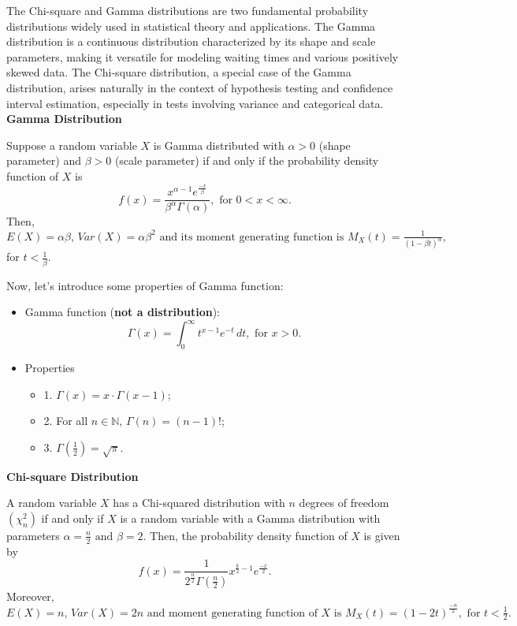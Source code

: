 The Chi-square and Gamma distributions are two fundamental probability distributions widely used in statistical theory and applications. The Gamma distribution is a continuous distribution characterized by its shape and scale parameters, making it versatile for modeling waiting times and various positively skewed data. The Chi-square distribution, a special case of the Gamma distribution, arises naturally in the context of hypothesis testing and confidence interval estimation, especially in tests involving variance and categorical data.\\

\textbf{Gamma Distribution}

\begin{definition}
Suppose a random variable $X$ is Gamma distributed with $\alpha > 0$ (shape parameter) and $\beta > 0$ (scale parameter) if and only if the probability density function of $X$ is \[ f(x) = \frac{x^{\alpha - 1} e^{\frac{-x}{\beta}}}{\beta^{\alpha} \Gamma(\alpha)}, \text{ for $0 < x < \infty.$}\]
Then, $E(X) = \alpha \beta \text{, } Var(X) = \alpha \beta^2 \text{ and its moment generating function is } M_{X}(t) = \frac{1}{(1 - \beta t)^{\alpha}},$ for $t < \frac{1}{\beta}.$
\end{definition}

Now, let's introduce some properties of Gamma function:

\begin{itemize}
	\item Gamma function (\textbf{not a distribution}): \[ \Gamma(x) = \int_{0}^{\infty}t^{x-1}e^{-t}\,dt, \text{ for $x > 0$.} \]
	\item Properties
		\begin{itemize}
			\item 1. $\Gamma(x) = x \cdot \Gamma(x-1)$;
			\item 2. For all $n \in \mathbb{N} \text{, } \Gamma(n) = (n - 1)!$; 
			\item 3. $\Gamma(\frac{1}{2}) = \sqrt{\pi}$.
		\end{itemize}
\end{itemize}

\textbf{Chi-square Distribution}

\begin{definition}
A random variable $X$ has a Chi-squared distribution with $n$ degrees of freedom $(\chi_{n}^{2})$ if and only if $X$ is a random variable with a Gamma distribution with parameters $\alpha = \frac{n}{2} \text{ and } \beta = 2.$ Then, the probability density function of $X$ is given by \[ f(x) = \frac{1}{2^{\frac{n}{2}} \Gamma(\frac{n}{2})} x^{\frac{k}{2} - 1} e^{\frac{-x}{2}}.\] Moreover, $E(X) = n \text{, } Var(X) = 2n \text{ and moment generating function of $X$ is } M_{X}(t) = (1 - 2t)^{\frac{-n}{2}}, \text{ for $t < \frac{1}{2}$}.$ 
\end{definition}

